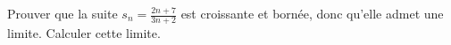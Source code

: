 

\begin{exercice}\label{exoINGE11140034}

	Prouver que la suite $s_n=\frac{ 2n+7 }{ 3n+2 }$ est croissante et bornée, donc qu'elle admet une limite. Calculer cette limite.

\end{exercice}
